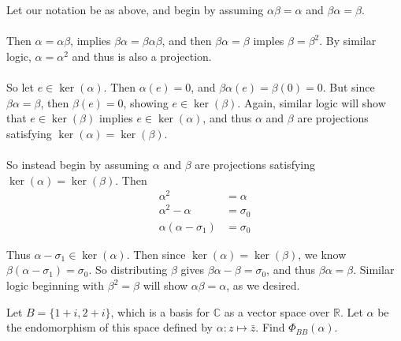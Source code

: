 \documentclass{article}
\begin{document}
\begin{solution}
Let our notation be as above, and begin by assuming $\alpha\beta = \alpha$ and $\beta\alpha = \beta$.

\paragraph{}
Then $\alpha=\alpha\beta$, implies $\beta\alpha = \beta\alpha\beta$, and then $\beta\alpha=\beta$ imples $\beta=\beta^{2}$. By similar logic, $\alpha=\alpha^{2}$ and thus is also a projection.

\paragraph{}
So let $e\in\ker(\alpha)$. Then $\alpha(e)=0$, and $\beta\alpha(e)=\beta(0)=0$. But since $\beta\alpha=\beta$, then $\beta(e)=0$, showing $e\in\ker(\beta)$. Again, similar logic will show that $e\in\ker(\beta)$ implies $e\in\ker(\alpha)$, and thus $\alpha$ and $\beta$ are projections satisfying $\ker(\alpha) = \ker(\beta)$.

\paragraph{}
So instead begin by assuming $\alpha$ and $\beta$ are projections satisfying $\ker(\alpha) = \ker(\beta)$. Then 
\begin{align*}
\alpha^{2} &= \alpha\\
\alpha^{2} -\alpha &= \sigma_{0} \\
\alpha(\alpha - \sigma_{1}) &= \sigma_{0}
\end{align*}

Thus $\alpha-\sigma_{1} \in \ker(\alpha)$. Then since $\ker(\alpha)=\ker(\beta)$, we know $\beta(\alpha-\sigma_{1}) = \sigma_{0}$. So distributing $\beta$ gives $\beta\alpha-\beta = \sigma_{0}$, and thus $\beta\alpha=\beta$. Similar logic beginning with $\beta^{2}=\beta$ will show $\alpha\beta=\alpha$, as we desired.
\end{solution}

\setcounter{section}{8}
\setcounter{problem}{420}
\begin{problem}
Let $B = \{ 1+i, 2+i \}$, which is a basis for $\mathbb{C}$ as a vector space over $\mathbb{R}$. Let $\alpha$ be the endomorphism of this space defined by $\alpha: z \mapsto \bar{z}$. Find $\Phi_{BB}(\alpha)$.
\end{problem}
\end{document}
